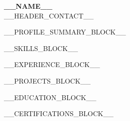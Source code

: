 \documentclass[10pt, letterpaper]{article}
\begin{document}

\begin{center}
    {\Huge \textbf{__NAME__}}\\[3pt]
    {\small
__HEADER_CONTACT__
    }
\end{center}

\vspace{-4pt}

__PROFILE_SUMMARY_BLOCK__

__SKILLS_BLOCK__

__EXPERIENCE_BLOCK__

__PROJECTS_BLOCK__

__EDUCATION_BLOCK__

__CERTIFICATIONS_BLOCK__
\end{document}
